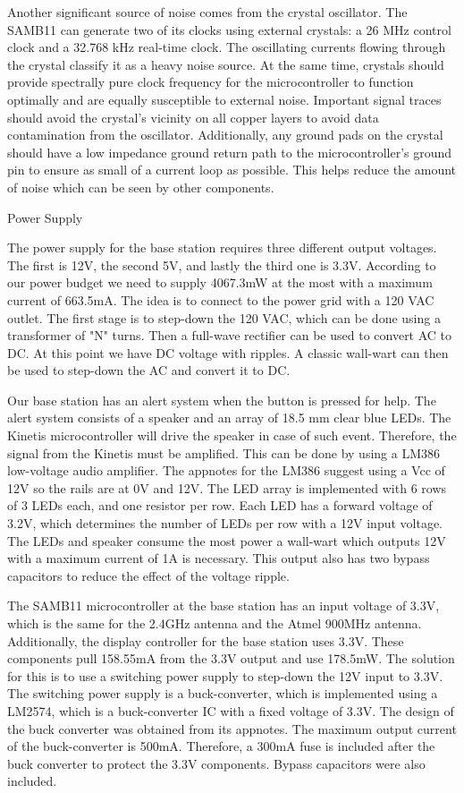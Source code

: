 \documentclass[journal]{IEEEtran}
\begin{document}
Another significant source of noise comes from the crystal oscillator.  The SAMB11 can generate two of its clocks using external crystals: a 26 MHz control clock and a 32.768 kHz real-time clock.  The oscillating currents flowing through the crystal classify it as a heavy noise source.  At the same time, crystals should provide spectrally pure clock frequency for the microcontroller to function optimally and are equally susceptible to external noise.  Important signal traces should avoid the crystal’s vicinity on all copper layers to avoid data contamination from the oscillator.  Additionally, any ground pads on the crystal should have a low impedance ground return path to the microcontroller’s ground pin to ensure as small of a current loop as possible.  This helps reduce the amount of noise which can be seen by other components.

Power Supply

The power supply for the base station requires three different output voltages.  The first is 12V, the second 5V, and lastly the third one is 3.3V.  According to our power budget we need to supply 4067.3mW at the most with a maximum current of 663.5mA.  The idea is to connect to the power grid with a 120 VAC outlet.  The first stage is to step-down the 120 VAC, which can be done using a transformer of "N" turns.  Then a full-wave rectifier can be used to convert AC to DC.  At this point we have DC voltage with ripples.  A classic wall-wart can then be used to step-down the AC and convert it to DC.

Our base station has an alert system when the button is pressed for help.  The alert system consists of a speaker and an array of 18.5 mm clear blue LEDs.  The Kinetis microcontroller will drive the speaker in case of such event.  Therefore, the signal from the Kinetis must be amplified.  This can be done by using a LM386 low-voltage audio amplifier.  The appnotes for the LM386 suggest using a Vcc of 12V so the rails are at 0V and 12V.  The LED array is implemented with 6 rows of 3 LEDs each, and one resistor per row.  Each LED has a forward voltage of 3.2V, which determines the number of LEDs per row with a 12V input voltage.  The LEDs and speaker consume the most power a wall-wart which outputs 12V with a maximum current of 1A is necessary.  This output also has two bypass capacitors to reduce the effect of the voltage ripple.

The SAMB11 microcontroller at the base station has an input voltage of 3.3V, which is the same for the 2.4GHz antenna and the Atmel 900MHz antenna.  Additionally, the display controller for the base station uses 3.3V.  These components pull 158.55mA from the 3.3V output and use 178.5mW.  The solution for this is to use a switching power supply to step-down the 12V input to 3.3V.  The switching power supply is a buck-converter, which is implemented using a LM2574, which is a buck-converter IC with a fixed voltage of 3.3V.  The design of the buck converter was obtained from its appnotes.  The maximum output current of the buck-converter is 500mA.  Therefore, a 300mA fuse is included after the buck converter to protect the 3.3V components.  Bypass capacitors were also included.
\end{document}
